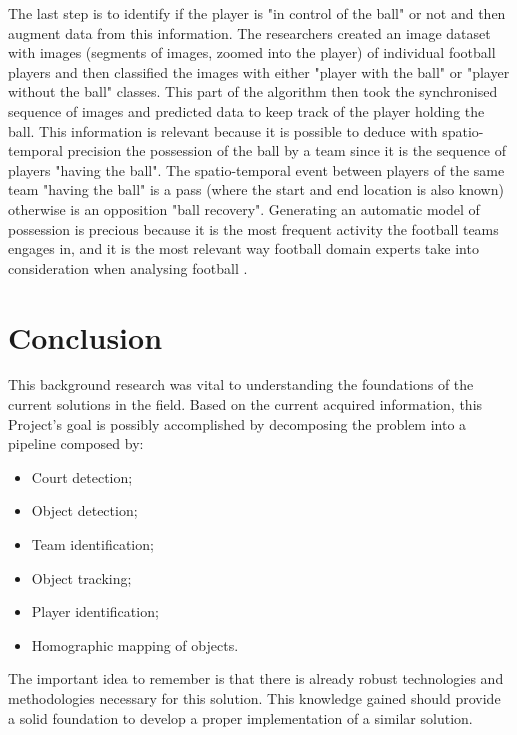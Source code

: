 \documentclass[
11pt,
twoside
]{report}
\begin{document}
The last step is to identify if the player is "in control of the ball" or not and then augment data from this information. The researchers created an image dataset with images (segments of images, zoomed into the player) of individual football players and then classified the images with either "player with the ball" or "player without the ball" classes. This part of the algorithm then took the synchronised sequence of images and predicted data to keep track of the player holding the ball. This information is relevant because it is possible to deduce with spatio-temporal precision the possession of the ball by a team since it is the sequence of players "having the ball". The spatio-temporal event between players of the same team "having the ball" is a pass (where the start and end location is also known) otherwise is an opposition "ball recovery". Generating an automatic model of possession is precious because it is the most frequent activity the football teams engages in, and it is the most relevant way football domain experts take into consideration when analysing football \cite{cvpr_2018}.




\section{Conclusion}




This background research was vital to understanding the foundations of the current solutions in the field. Based on the current acquired information, this Project's goal is possibly accomplished by decomposing the problem into a pipeline composed by:

\begin{itemize}
\item Court detection;
\item Object detection;
\item Team identification;
\item Object tracking;
\item Player identification;
\item Homographic mapping of objects.
\end{itemize}


The important idea to remember is that there is already robust technologies and methodologies necessary for this solution. This knowledge gained should provide a solid foundation to develop a proper implementation of a similar solution.
\end{document}
